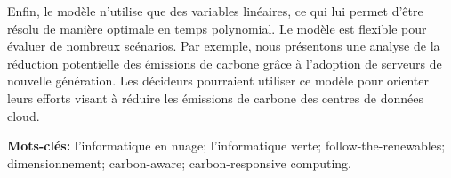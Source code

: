 Enfin, le modèle n'utilise que des variables linéaires, ce qui lui permet d'être résolu de manière optimale en temps polynomial. Le modèle est flexible pour évaluer de nombreux scénarios. Par exemple, nous présentons une analyse de la réduction potentielle des émissions de carbone grâce à l'adoption de serveurs de nouvelle génération. Les décideurs pourraient utiliser ce modèle pour orienter leurs efforts visant à réduire les émissions de carbone des centres de données cloud.



\textbf{Mots-clés:} l'informatique en nuage; l'informatique verte; follow-the-renewables; dimensionnement; carbon-aware; carbon-responsive computing. 

